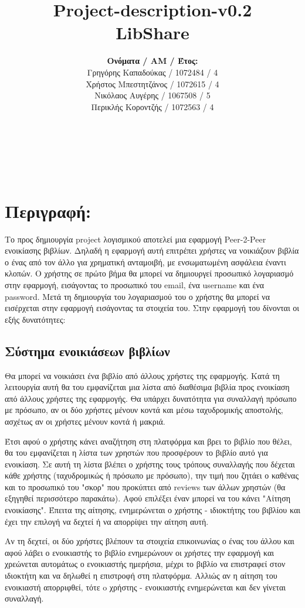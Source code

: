 \documentclass[12pt,a4paper]{article}
\title{Project-description-v0.2 \\ LibShare}
\author{\textbf{Ονόματα / ΑΜ / Έτος:} \\ Γρηγόρης Καπαδούκας / 1072484 / 4\textdegree \\ Χρήστος Μπεστητζάνος / 1072615 / 4\textdegree \\ Νικόλαος Αυγέρης / 1067508 / 5\textdegree \\ Περικλής Κοροντζής / 1072563 / 4\textdegree}
\begin{document}
\makeatletter
\begin{center}
	\LARGE{\@title} \\
	\pagebreak
	\begin{LARGE}\@author\end{LARGE} \\
\end{center}
\pagebreak

\section{Περιγραφή:}
\label{Περιγραφή}
Το προς δημιουργία project λογισμικού αποτελεί μια εφαρμογή Peer-2-Peer ενοικίασης βιβλίων. Δηλαδή η εφαρμογή αυτή επιτρέπει χρήστες να νοικιάζουν βιβλία ο ένας από τον άλλο για χρηματική ανταμοιβή, με ενσωματωμένη ασφάλεια έναντι κλοπών. Ο χρήστης σε πρώτο βήμα θα μπορεί να δημιουργεί προσωπικό λογαριασμό στην εφαρμογή, εισάγοντας το προσωπικό του email, ένα username και ένα password. Μετά τη δημιουργία του λογαριασμού του ο χρήστης θα μπορεί να εισέρχεται στην εφαρμογή εισάγοντας τα στοιχεία του. Στην εφαρμογή του δίνονται οι εξής δυνατότητες:

\subsection{Σύστημα ενοικιάσεων βιβλίων}
Θα μπορεί να νοικιάσει ένα βιβλίο από άλλους χρήστες της εφαρμογής. Κατά τη λειτουργία αυτή θα του εμφανίζεται μια λίστα από διαθέσιμα βιβλία προς ενοικίαση από άλλους χρήστες της εφαρμογής. Θα υπάρχει δυνατότητα για συναλλαγή πρόσωπο με πρόσωπο, αν οι δύο χρήστες μένουν κοντά και μέσω ταχυδρομικής αποστολής, ασχέτως αν οι χρήστες μένουν κοντά ή μακριά.

Έτσι αφού ο χρήστης κάνει αναζήτηση στη πλατφόρμα και βρει το βιβλίο που θέλει, θα του εμφανίζεται η λίστα των χρηστών που προσφέρουν το βιβλίο αυτό για ενοικίαση. Σε αυτή τη λίστα βλέπει ο χρήστης τους τρόπους συναλλαγής που δέχεται κάθε χρήστης (ταχυδρομικώς ή πρόσωπο με πρόσωπο), την τιμή που ζητάει ο καθένας και το προσωπικό του "σκορ" που προκύπτει από reviews των άλλων χρηστών (θα εξηγηθεί περισσότερο παρακάτω). Αφού επιλέξει έναν μπορεί να του κάνει "Αίτηση ενοικίασης". Έπειτα της αίτησης, ενημερώνεται ο χρήστης - ιδιοκτήτης του βιβλίου και έχει την επιλογή να δεχτεί ή να απορρίψει την αίτηση αυτή.

Αν τη δεχτεί, οι δύο χρήστες βλέπουν τα στοιχεία επικοινωνίας ο ένας του άλλου και αφού λάβει ο ενοικιαστής το βιβλίο ενημερώνουν οι χρήστες την εφαρμογή και χρεώνεται αυτομάτως ο ενοικιαστής ημερήσια, μέχρι το βιβλίο να επιστραφεί στον ιδιοκτήτη και να δηλωθεί η επιστροφή στη πλατφόρμα. 
Αλλιώς αν η αίτηση του ενοικιαστή απορριφθεί, τότε o χρήστης - ενοικιαστής ενημερώνεται και δεν γίνεται συναλλαγή.
\end{document}
